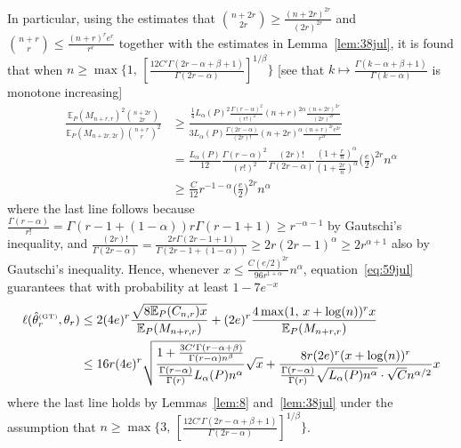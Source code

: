 \documentclass{article}
\newcommand{\1}{\boldsymbol{1}}
\newcommand{\EE}{\mathbb{E}}
\theoremstyle{plain}
\begin{document}
In particular, using the estimates that $\binom{n+2r}{2r} \geq \frac{(n+2r)^{2r}}{(2r)^{2r}}$ and $\binom{n+r}{r} \leq \frac{(n+r)^re^r}{r^r}$ together with the estimates in Lemma~\ref{lem:38jul}, it is found that when $n \geq \max\{1,\, [\frac{12C'\Gamma(2r-\alpha+\beta+1)}{\Gamma(2r-\alpha)}]^{1/\beta}\}$ [see that $k\mapsto \frac{\Gamma(k-\alpha+\beta+1)}{\Gamma(k-\alpha)}$ is monotone increasing]
  \begin{align*}
   \frac{\EE_P(M_{n+r,r})^2\binom{n+2r}{2r} }{\EE_P(M_{n+2r,2r})\binom{n+r}{r}^2}
    &\geq%
      \frac{\frac{1}{4}L_{\alpha}(P)^2\frac{\Gamma(r-\alpha)^2}{(r!)^2}(n+r)^{2\alpha} \frac{(n+2r)^{2r}}{(2r)^{2r}} }{3L_{\alpha}(P)\frac{\Gamma(2r-\alpha)}{(2r)!}(n+2r)^{\alpha} \frac{(n+r)^{2r}e^{2r}}{r^{2r}}}\\
    &= \frac{L_{\alpha}(P)}{12}\frac{\Gamma(r-\alpha)^2}{(r!)^2}\frac{(2r)!}{\Gamma(2r-\alpha)}\frac{(1 + \frac{r}{n})^{\alpha}}{(1+\frac{2r}{n})^{\alpha}}\Big(\frac{e}{2} \Big)^{2r}n^{\alpha}\\
    &\geq \frac{C}{12}r^{-1-\alpha}\Big(\frac{e}{2} \Big)^{2r} n^{\alpha}
  \end{align*}
  where the last line follows because $\frac{\Gamma(r-\alpha)}{r!} = \Gamma(r-1 + (1-\alpha)){r\Gamma(r-1+1)} \geq r^{-\alpha-1}$ by Gautschi's inequality, and $\frac{(2r)!}{\Gamma(2r-\alpha)} = \frac{2r\Gamma(2r-1 + 1)}{\Gamma(2r-1 + (1-\alpha))}\geq 2r(2r-1)^{\alpha}\geq 2r^{\alpha+1}$ also by Gautschi's inequality. Hence, whenever $x \leq \frac{C(e/2)^{2r}}{96r^{1+\alpha}}n^{\alpha}$, equation~\eqref{eq:59jul} guarantees that with probability at least $1-7e^{-x}$
  \begin{align*}
    \ell(\hat{\theta}_r^{\text{\tiny{(GT)}}},\theta_r)%
    &\leq%
    2(4e)^r\frac{\sqrt{8\EE_P(C_{n,r})x}}{\EE_P(M_{n+r,r})}%
    + (2e)^r\frac{4\max(1,\,x+\log(n))^rx}{\EE_P(M_{n+r,r})}\\
    &\leq 16r(4e)^r\sqrt{\frac{1 + \frac{3C'\Gamma(r-\alpha+\beta)}{\Gamma(r-\alpha)n^{\beta}}}
      {\frac{\Gamma(r-\alpha)}{\Gamma(r)}L_{\alpha}(P)n^{\alpha}}}\sqrt{x}%
      + \frac{8r(2e)^r(x + \log(n))^r}{\frac{\Gamma(r-\alpha)}{\Gamma(r)} \sqrt{L_{\alpha}(P)n^{\alpha}}\cdot\sqrt{C}n^{\alpha/2}}x
  \end{align*}
  where the last line holds by Lemmas~\ref{lem:8} and~\ref{lem:38jul} under the assumption that $n \geq \max\{3,\, [\frac{12C'\Gamma(2r-\alpha+\beta+1)}{\Gamma(2r-\alpha)}]^{1/\beta}\}$.
\end{document}
